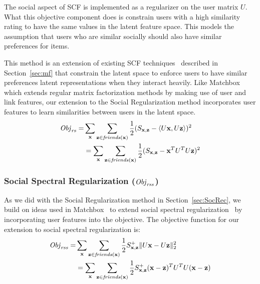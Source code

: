 The social aspect of SCF is implemented as a regularizer on the user
matrix $U$. What this objective component does is constrain users with
a high similarity rating to have the same values in the latent feature
space. This models the assumption that users who are similar socially
should also have similar preferences for items.

This method is an extension of existing SCF
techniques~\cite{lla,socinf} described in Section~\ref{sec:mf} that
constrain the latent space to enforce users to have similar
preferences latent representations when they interact heavily.  Like
Matchbox which extends regular matrix factorization methods by making
use of user and link features, our extension to the Social
Regularization method incorporates user features to learn similarities
between users in the latent space.
\begin{align}
\mathit{Obj}_{\mathit{rs}} = & \sum_{\mathbf{x}} \sum_{\mathbf{z} \in \mathit{friends}(\mathbf{x})} \frac{1}{2} (S_{\mathbf{x},\mathbf{z}} - \langle U\mathbf{x}, U\mathbf{z} \rangle)^2 \\
& = \sum_{\mathbf{x}} \sum_{\mathbf{z} \in \mathit{friends}(\mathbf{x})} \frac{1}{2} (S_{\mathbf{x},\mathbf{z}} - \mathbf{x}^T U^T U \mathbf{z})^2 \nonumber 
\end{align}

\subsubsection{Social Spectral Regularization ($\mathit{Obj}_{\mathit{rss}}$)}

As we did with the Social Regularization method in
Section~\ref{sec:SocRec}, we build on ideas used in
Matchbox~\cite{matchbox} to extend social spectral
regularization~\cite{sr,rrmf} by incorporating user features into the
objective.  The objective function for our extension to social spectral
regularization is:
\begin{align}
\mathit{Obj}_{\mathit{rss}} = & \sum_{\mathbf{x}} \sum_{\mathbf{z} \in \mathit{friends}(\mathbf{x})} \frac{1}{2} S^+_{\mathbf{x},\mathbf{z}} \| U\mathbf{x} - U\mathbf{z} \|_2^2 \\
& = \sum_{\mathbf{x}} \sum_{\mathbf{z} \in \mathit{friends}(\mathbf{x})} \frac{1}{2} S^+_{\mathbf{x},\mathbf{z}} (\mathbf{x} - \mathbf{z})^T U^T U (\mathbf{x} - \mathbf{z}) \nonumber
\end{align}


